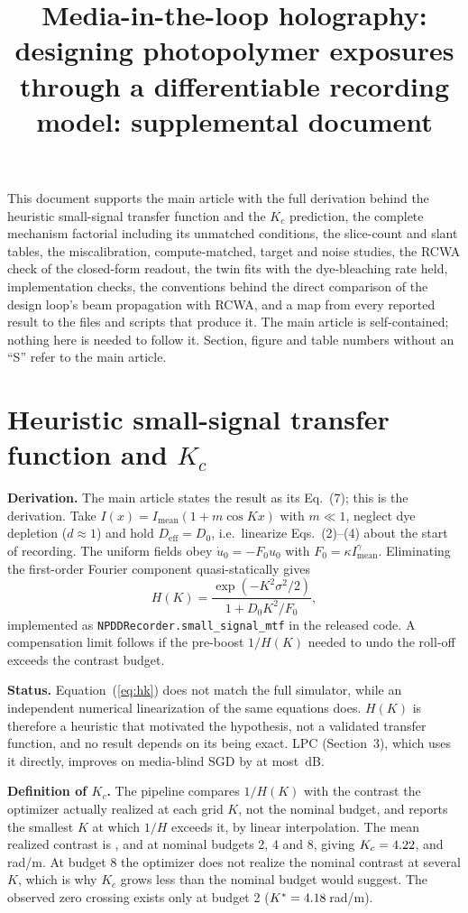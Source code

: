\documentclass{optica-article}
\begin{document}
\title{Media-in-the-loop holography: designing photopolymer exposures through a
differentiable recording model: supplemental document}

\begin{abstract*}
This document supports the main article with the full derivation behind the
heuristic small-signal transfer function and the $K_c$ prediction, the complete
mechanism factorial including its unmatched conditions, the slice-count and
slant tables, the miscalibration, compute-matched, target and noise studies,
the RCWA check of the closed-form readout, the twin fits with the dye-bleaching
rate held, implementation checks, the conventions behind the direct comparison
of the design loop's beam propagation with RCWA, and a map from every reported
result to the files and scripts that produce it. The main article is self-contained; nothing
here is needed to follow it. Section, figure and table numbers without an
``S'' refer to the main article.
\end{abstract*}

\section{Heuristic small-signal transfer function and $K_c$}
\label{sec:s1}
\textbf{Derivation.} The main article states the result as its Eq.~(7); this is
the derivation. Take $I(x)=I_{\text{mean}}(1+m\cos Kx)$ with $m\ll1$,
neglect dye depletion ($d\approx1$) and hold $D_{\text{eff}}=D_0$, i.e.\
linearize Eqs.~(2)--(4) about the start of recording. The uniform fields obey
$\dot u_0=-F_0u_0$ with $F_0=\kappa I_{\text{mean}}^\gamma$. Eliminating the
first-order Fourier component quasi-statically gives
\begin{equation}
H(K)=\frac{\exp(-K^2\sigma^2/2)}{1+D_0K^2/F_0},
\label{eq:hk}
\end{equation}
implemented as \texttt{NPDDRecorder.small\_signal\_mtf} in the released code. A
compensation limit follows if the pre-boost $1/H(K)$ needed to undo the
roll-off exceeds the contrast budget.

\textbf{Status.} Equation~(\ref{eq:hk}) does not match the full simulator, while
an independent numerical linearization of the same equations does. $H(K)$ is
therefore a heuristic that motivated the hypothesis, not a validated transfer
function, and no result depends on its being exact. LPC (Section~3), which
uses it directly, improves on media-blind SGD by at most \LPCGainMax\,dB.

\textbf{Definition of $K_c$.} The pipeline compares $1/H(K)$ with the contrast
the optimizer actually realized at each grid $K$, not the nominal budget, and
reports the smallest $K$ at which $1/H$ exceeds it, by linear interpolation.
The mean realized contrast is \MeasuredContrastTwoX, \MeasuredContrastFourX{}
and \MeasuredContrastEightX{} at nominal budgets 2, 4 and 8, giving
$K_c=4.22$, \KcPredFourX{} and \KcPredEightX\,rad/\textmu m. At budget 8
the optimizer does not realize the nominal contrast at several $K$, which is
why $K_c$ grows less than the nominal budget would suggest. The observed zero
crossing exists only at budget 2 ($K^*=4.18$\,rad/\textmu m).
\end{document}
